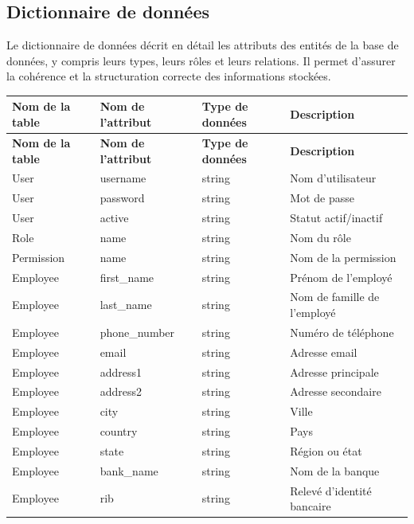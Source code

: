 \subsection{Dictionnaire de données}
Le dictionnaire de données décrit en détail les attributs des entités de la base de données, y compris leurs types, leurs rôles et leurs relations. Il permet d'assurer la cohérence et la structuration correcte des informations stockées.

\renewcommand{\arraystretch}{1.3} %

\begin{longtable}{|p{3.5cm}|p{3.5cm}|p{3cm}|p{5cm}|}
    \hline
    \textbf{Nom de la table} & \textbf{Nom de l'attribut} & \textbf{Type de données} & \textbf{Description} \\
    \hline
    \endfirsthead

    \hline
    \textbf{Nom de la table} & \textbf{Nom de l'attribut} & \textbf{Type de données} & \textbf{Description} \\
    \hline
    \endhead

    \hline
    User & username & string & Nom d'utilisateur \\
    \hline
    User & password & string & Mot de passe \\
    \hline
    User & active & string & Statut actif/inactif \\
    \hline
    
    Role & name & string & Nom du rôle \\
    \hline
    
    Permission & name & string & Nom de la permission \\
    \hline

    Employee & first\_name & string & Prénom de l'employé \\
    \hline
    Employee & last\_name & string & Nom de famille de l'employé \\
    \hline
    Employee & phone\_number & string & Numéro de téléphone \\
    \hline
    Employee & email & string & Adresse email \\
    \hline
    Employee & address1 & string & Adresse principale \\
    \hline
    Employee & address2 & string & Adresse secondaire \\
    \hline
    Employee & city & string & Ville \\
    \hline
    Employee & country & string & Pays \\
    \hline
    Employee & state & string & Région ou état \\
    \hline
    Employee & bank\_name & string & Nom de la banque \\
    \hline
    Employee & rib & string & Relevé d'identité bancaire \\
    \hline


\end{longtable}
